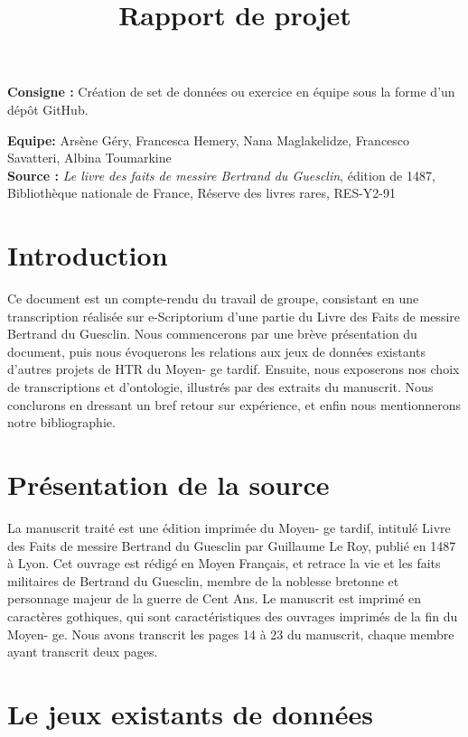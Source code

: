 \documentclass[12pt,a4paper]{article}
\title{\vspace{-2cm}Rapport de projet}
\begin{document}


	\maketitle
	
\textbf{Consigne : } Création de set de données ou exercice en équipe sous la forme d'un dépôt GitHub.

\textbf{Equipe: }Arsène Géry, Francesca Hemery, Nana Maglakelidze, Francesco Savatteri, Albina Toumarkine \\
\textbf{Source :} \textit{Le livre des faits de messire Bertrand du Guesclin}, édition de 1487, Bibliothèque nationale de France, Réserve des livres rares, RES-Y2-91

\section{Introduction}
Ce document est un compte-rendu du travail de groupe, consistant en une transcription réalisée sur e-Scriptorium d’une partie du Livre des Faits de messire Bertrand du Guesclin. Nous commencerons par une brève présentation du document, puis nous évoquerons les relations aux jeux de données existants d’autres projets de HTR du Moyen- ge tardif. Ensuite, nous exposerons nos choix de transcriptions et d’ontologie, illustrés par des extraits du manuscrit. Nous conclurons en dressant un bref retour sur expérience, et enfin nous mentionnerons notre bibliographie.


\section{ Présentation de la source}
La manuscrit traité est une édition imprimée du Moyen- ge tardif, intitulé Livre des Faits de messire Bertrand du Guesclin par Guillaume Le Roy, publié en 1487 à Lyon. Cet ouvrage est rédigé en Moyen Français, et retrace la vie et les faits militaires de Bertrand du Guesclin, membre de la noblesse bretonne et personnage majeur de la guerre de Cent Ans. Le manuscrit est imprimé en caractères gothiques, qui sont caractéristiques des ouvrages imprimés de la fin du Moyen- ge. 
Nous avons transcrit les pages 14 à 23 du manuscrit, chaque membre ayant transcrit deux pages.


\section{Le jeux existants de données}
\end{document}
